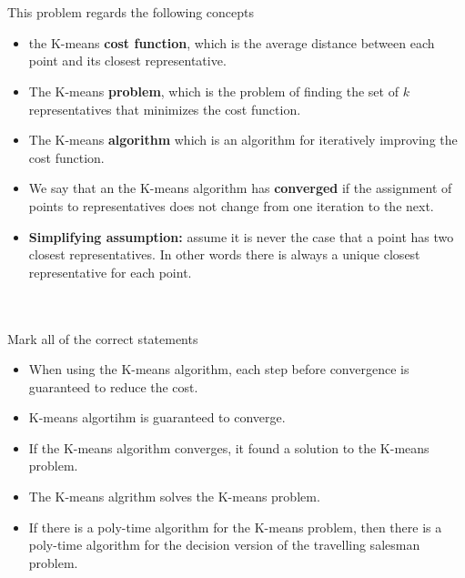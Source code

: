 \documentclass[10pt]{article}
\begin{document}
\newcommand{\uu}{\vec{u}}
\newcommand{\xx}{\vec{x}}
\newcommand{\yy}{\vec{y}}
\newcommand{\vmu}{\vec{\mu}}
~\\
~\\
\noindent
    This problem regards the following concepts
    \begin{itemize}
      \item the K-means {\bf cost function}, which is the
    average distance between each point and its closest
    representative.
    \item The K-means {\bf problem}, which is the
    problem of finding the set of $k$ representatives that minimizes
    the cost function.
    \item The K-means {\bf algorithm} which is an algorithm for
      iteratively improving the cost function.
    \item We say that an the K-means algorithm has
    {\bf converged} if the assignment of points to representatives does not
    change from one iteration to the next.
    \item {\bf Simplifying assumption:} assume it is never the case
      that a point has two closest representatives. In other words
      there is always a unique closest representative for each point.
    \end{itemize}
    ~\\
    ~\\
    Mark all of the correct statements
    \begin{itemize}
      \item When using the K-means algorithm, each step before
        convergence is guaranteed to reduce the cost. 
    \item K-means algortihm is guaranteed to converge.
    \item If the K-means algorithm converges, it found a solution to
      the K-means problem.
    \item The K-means algrithm solves the K-means problem.
    \item If there is a poly-time algorithm for the K-means
      problem, then there is a poly-time algorithm for the decision
      version of the travelling salesman problem.
    \end{itemize}
\end{document}
